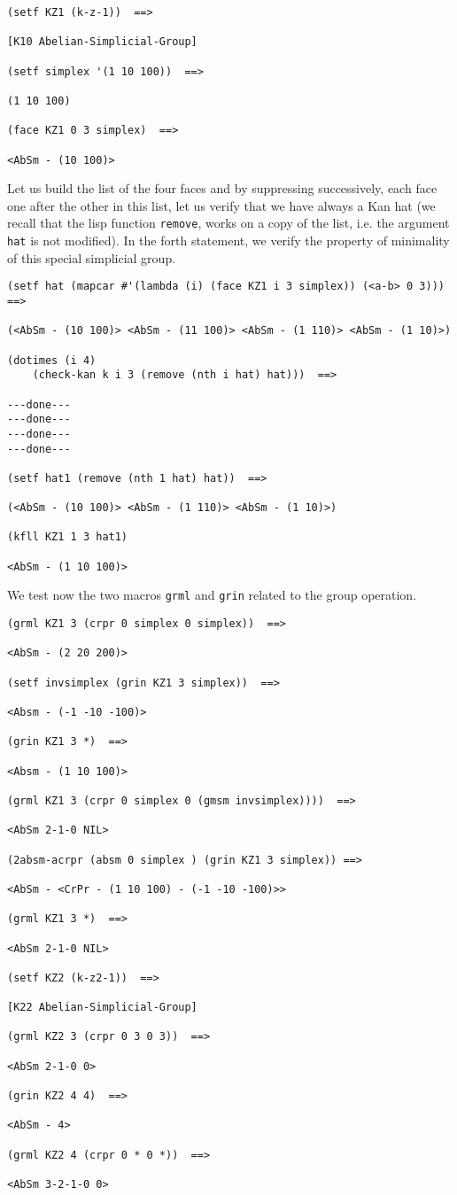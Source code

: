 {\footnotesize\begin{verbatim}
(setf KZ1 (k-z-1))  ==>

[K10 Abelian-Simplicial-Group]

(setf simplex '(1 10 100))  ==>

(1 10 100)

(face KZ1 0 3 simplex)  ==>

<AbSm - (10 100)>
\end{verbatim}}
Let us build the list of the four faces and by suppressing successively, each face one after the other
in this list, let us verify that we have always a Kan hat (we recall that the lisp function {\tt remove}, works
on a copy of the list, i.e. the argument {\tt hat} is not modified). In the forth  statement, we
verify the property of minimality of this special simplicial group.
{\footnotesize\begin{verbatim}
(setf hat (mapcar #'(lambda (i) (face KZ1 i 3 simplex)) (<a-b> 0 3)))  ==>

(<AbSm - (10 100)> <AbSm - (11 100)> <AbSm - (1 110)> <AbSm - (1 10)>)

(dotimes (i 4)
    (check-kan k i 3 (remove (nth i hat) hat)))  ==>

---done---
---done---
---done---
---done---

(setf hat1 (remove (nth 1 hat) hat))  ==>

(<AbSm - (10 100)> <AbSm - (1 110)> <AbSm - (1 10)>)

(kfll KZ1 1 3 hat1)

<AbSm - (1 10 100)>
\end{verbatim}}
We test now the two macros {\tt grml} and {\tt grin} related to the group operation.
{\footnotesize\begin{verbatim}
(grml KZ1 3 (crpr 0 simplex 0 simplex))  ==>

<AbSm - (2 20 200)>

(setf invsimplex (grin KZ1 3 simplex))  ==>

<Absm - (-1 -10 -100)>

(grin KZ1 3 *)  ==>

<Absm - (1 10 100)>

(grml KZ1 3 (crpr 0 simplex 0 (gmsm invsimplex))))  ==>

<AbSm 2-1-0 NIL>

(2absm-acrpr (absm 0 simplex ) (grin KZ1 3 simplex)) ==>

<AbSm - <CrPr - (1 10 100) - (-1 -10 -100)>>

(grml KZ1 3 *)  ==>

<AbSm 2-1-0 NIL>

(setf KZ2 (k-z2-1))  ==>

[K22 Abelian-Simplicial-Group]

(grml KZ2 3 (crpr 0 3 0 3))  ==>

<AbSm 2-1-0 0>

(grin KZ2 4 4)  ==>

<AbSm - 4>

(grml KZ2 4 (crpr 0 * 0 *))  ==>

<AbSm 3-2-1-0 0>
\end{verbatim}}
